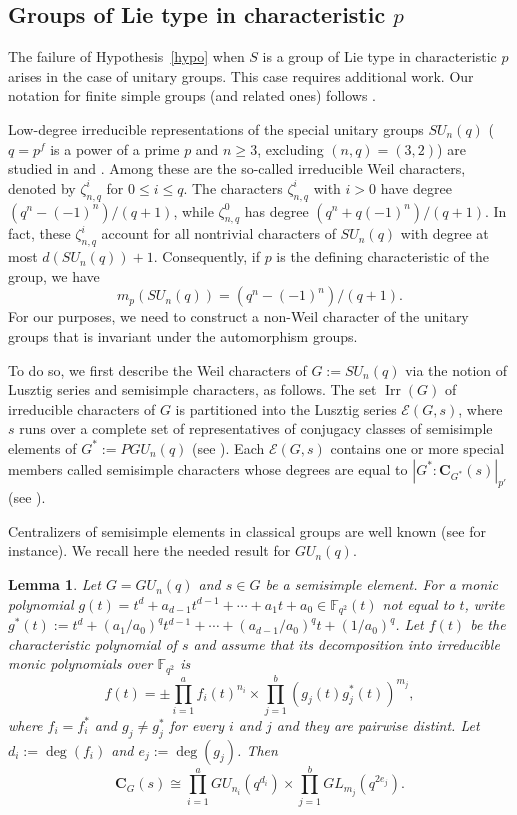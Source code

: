 \documentclass[12pt]{amsart}
\theoremstyle{plain}
\newtheorem{lem}[thm]{Lemma}
\theoremstyle{definition}
\numberwithin{equation}{section}
\newcommand{\Irr}{\operatorname{Irr}}
\newcommand{\FF}{\mathbb{F}}
\newcommand{\bC}{{\mathbf{C}}}
\begin{document}
\subsection{Groups of Lie type in characteristic $p$}



The failure of Hypothesis~\ref{hypo} when $S$ is a group of Lie type
in characteristic $p$ arises in the case of unitary groups. This
case requires additional work. Our notation for finite simple groups
(and related ones) follows \cite{Carter85,Atlas}.

Low-degree irreducible representations of the special unitary groups
$SU_n(q)$ ($q=p^f$ is a power of a prime $p$ and $n\geq 3$,
excluding $(n,q)=(3,2)$) are studied in \cite[\S4]{TZ96} and
\cite[\S6.1]{LOST10}. Among these are the so-called irreducible Weil
characters, denoted by $\zeta^i_{n,q}$ for $0\leq i\leq q$. The
characters $\zeta^i_{n,q}$ with $i>0$ have degree
$(q^n-(-1)^n)/(q+1)$, while $\zeta^0_{n,q}$ has degree
$(q^n+q(-1)^n)/(q+1)$. In fact, these $\zeta^i_{n,q}$ account for
all nontrivial characters of $SU_n(q)$ with degree at most
$d(SU_n(q))+1$. Consequently, if $p$ is the defining characteristic
of the group, we have
\[m_p(SU_n(q))=(q^n-(-1)^n)/(q+1).\] For our purposes, we
need to construct a non-Weil character of the unitary groups that is
invariant under the automorphism groups.


To do so, we first describe the Weil characters of $G:=SU_n(q)$ via
the notion of Lusztig series and semisimple characters, as follows.
The set $\Irr(G)$ of irreducible characters of $G$ is partitioned
into the Lusztig series $\mathcal{E}(G,s)$, where $s$ runs over a
complete set of representatives of conjugacy classes of semisimple
elements of $G^*:=PGU_n(q)$ (see \cite[Theorem~2.6.2]{GM20}). Each
$\mathcal{E}(G,s)$ contains one or more special members called
semisimple characters whose degrees are equal to
$|G^*:\bC_{G^*}(s)|_{p'}$ (see \cite[Definition~2.6.9]{GM20}).

Centralizers of semisimple elements in classical groups are well
known (see \cite{Carter81,Fra20} for instance). We recall here the
needed result for $GU_n(q)$.

\begin{lem}
\label{lem:cen} Let $G=GU_n(q)$ and $s\in G$ be a semisimple
element. For a monic polynomial
$g(t)=t^d+a_{d-1}t^{d-1}+\cdots+a_1t+a_0\in \FF_{q^2}(t)$ not equal
to $t$, write
$g^*(t):=t^d+(a_1/a_0)^qt^{d-1}+\cdots+(a_{d-1}/a_0)^qt+(1/a_0)^q$.
Let $f(t)$ be the characteristic polynomial of $s$ and assume that
its decomposition into irreducible monic polynomials over
$\FF_{q^2}$ is
\[
f(t)=\pm\prod_{i=1}^a f_i(t)^{n_i} \times \prod_{j=1}^b
(g_j(t)g_j^*(t))^{m_j},
\]
where $f_i=f_i^*$ and $g_j\neq g_j^*$ for every $i$ and $j$ and they
are pairwise distint. Let $d_i:=\deg(f_i)$ and $e_j:=\deg(g_j)$.
Then
\[
\bC_G(s)\cong \prod_{i=1}^a GU_{n_i}(q^{d_i})\times \prod_{j=1}^b
GL_{m_j}(q^{2e_j}).
\]
\end{lem}
\end{document}
